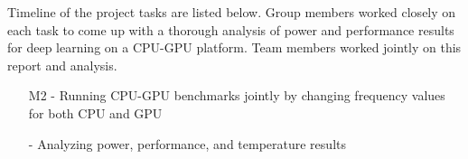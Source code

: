 Timeline of the project tasks are listed below. Group members worked closely on each task to come up with a thorough analysis of power and performance results for deep learning on a CPU-GPU platform. Team members worked jointly on this report and analysis.  

\begin{itemize}
\item[M2 -] Running CPU-GPU benchmarks jointly by changing frequency values for both CPU and GPU
\item[-] Analyzing power, performance, and temperature results 
\end{itemize}